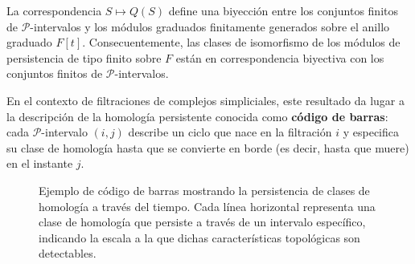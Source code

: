 \begin{corolario}
La correspondencia \( S \mapsto Q(S) \) define una biyección entre los conjuntos finitos de $\mathcal{P}$-intervalos y los módulos graduados finitamente generados sobre el anillo graduado \( F[t] \). Consecuentemente, las clases de isomorfismo de los módulos de persistencia de tipo finito sobre \( F \) están en correspondencia biyectiva con los conjuntos finitos de $\mathcal{P}$-intervalos.
\end{corolario}

En el contexto de filtraciones de complejos simpliciales, este resultado da lugar a la descripción de la homología persistente conocida como \textbf{código de barras}: cada $\mathcal{P}$-intervalo $(i, j)$ describe un ciclo que nace en la filtración $i$ y especifica su clase de homología hasta que se convierte en borde (es decir, hasta que muere) en el instante $j$.%

\begin{figure}[h]
	\label{fig:barcode}
	\centering
{}
\caption{Ejemplo de código de barras mostrando la persistencia de clases de homología a través del tiempo. Cada línea horizontal representa una clase de homología que persiste a través de un intervalo específico, indicando la escala a la que dichas características topológicas son detectables.}
\end{figure}

